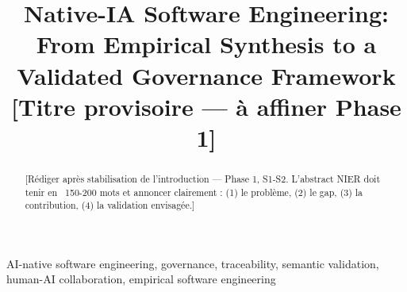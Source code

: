 \documentclass[conference]{IEEEtran}
\begin{document}
\title{Native-IA Software Engineering: From Empirical Synthesis to a Validated Governance Framework\\
\large{[Titre provisoire — à affiner Phase 1]}}

\author{
}

\maketitle

\begin{abstract}
[Rédiger après stabilisation de l'introduction — Phase 1, S1-S2.
L'abstract NIER doit tenir en ~150-200 mots et annoncer clairement :
(1) le problème, (2) le gap, (3) la contribution, (4) la validation envisagée.]
\end{abstract}

\begin{IEEEkeywords}
AI-native software engineering, governance, traceability, semantic validation,
human-AI collaboration, empirical software engineering
\end{IEEEkeywords}










\end{document}
